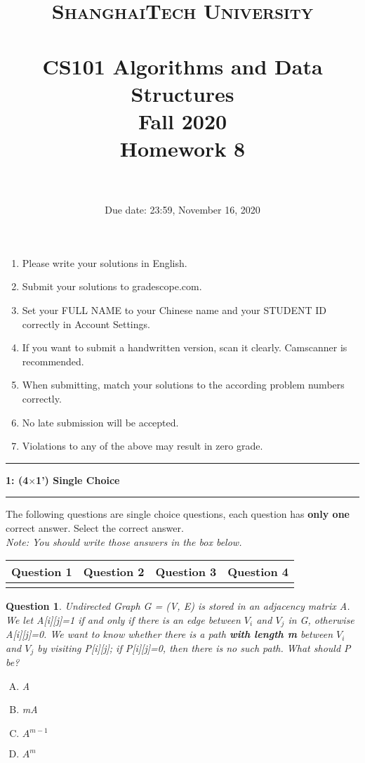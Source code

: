 \documentclass[10.5pt]{article}
\title{
	\normalfont \normalsize
	\textsc{ShanghaiTech University} \\ [25pt]
	\horrule{0.5pt} \\[0.4cm] %
	\huge CS101 Algorithms and Data Structures\\ %
	\LARGE Fall 2020\\
	\LARGE Homework 8\\
	\horrule{2pt} \\[0.5cm] %
}
\author{}
\date{Due date: 23:59, November 16, 2020}
\newcommand\question[2]{\vspace{.25in}\hrule\textbf{#1: #2}\vspace{.5em}\hrule\vspace{.10in}}
\newtheorem{Q}{Question}
\begin{document}
	
	\maketitle
	\thispagestyle{firstpage}
	\vspace{3ex}
	
	\begin{enumerate}
		\item Please write your solutions in English. 
		
		\item Submit your solutions to gradescope.com.  
		
		\item Set your FULL NAME to your Chinese name and your STUDENT ID correctly in Account Settings. 
		
		\item If you want to submit a handwritten version, scan it clearly. Camscanner is recommended. 
		
		\item When submitting, match your solutions to the according problem numbers correctly. 
		
		\item No late submission will be accepted.
		
		\item Violations to any of the above may result in zero grade. 
	\end{enumerate}
	\newpage

\question{1}{(4$\times$1') Single Choice}
The following \textit{} questions are single choice questions, each question has \textbf{only one} correct answer. Select the correct answer.\\
\textit{Note: You should write those answers in the box below.}

\begin{table}[htbp]
	\begin{tabular}{|p{2cm}|p{2cm}|p{2cm}|p{2cm}|}
		\hline 
		Question 1 & Question 2 & Question 3 & Question 4\\
		\hline
		& & & \\ 
		\hline 
	\end{tabular} 
\end{table}



    \begin{Q}
Undirected Graph G = (V, E) is stored in an adjacency matrix A. We let A[i][j]=1 if and only if there is an edge between $V_i$ and $V_j$ in G, otherwise A[i][j]=0. We want to know whether there is a path \textbf{with length m} between $V_i$ and $V_j$ by visiting P[i][j]; if P[i][j]=0, then there is no such path. What should P be?
\begin{enumerate}[(A)]
	\item A
	\item mA
	\item $A^{m-1}$
	\item $A^m$
\end{enumerate}
\end{Q}
\end{document}
